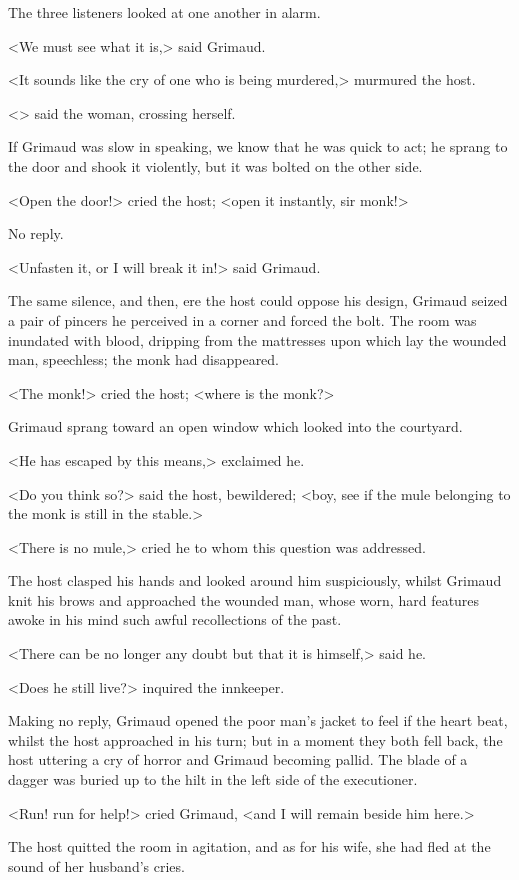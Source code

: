 The three listeners looked at one another in alarm.

<We must see what it is,> said Grimaud.

<It sounds like the cry of one who is being murdered,> murmured the host.

<> said the woman, crossing herself.

If Grimaud was slow in speaking, we know that he was quick to act; he sprang to the door and shook it violently, but it was bolted on the other side.

<Open the door!> cried the host; <open it instantly, sir monk!>

No reply.

<Unfasten it, or I will break it in!> said Grimaud.

The same silence, and then, ere the host could oppose his design, Grimaud seized a pair of pincers he perceived in a corner and forced the bolt. The room was inundated with blood, dripping from the mattresses upon which lay the wounded man, speechless; the monk had disappeared.

<The monk!> cried the host; <where is the monk?>

Grimaud sprang toward an open window which looked into the courtyard.

<He has escaped by this means,> exclaimed he.

<Do you think so?> said the host, bewildered; <boy, see if the mule belonging to the monk is still in the stable.>

<There is no mule,> cried he to whom this question was addressed.

The host clasped his hands and looked around him suspiciously, whilst Grimaud knit his brows and approached the wounded man, whose worn, hard features awoke in his mind such awful recollections of the past.

<There can be no longer any doubt but that it is himself,> said he.

<Does he still live?> inquired the innkeeper.

Making no reply, Grimaud opened the poor man's jacket to feel if the heart beat, whilst the host approached in his turn; but in a moment they both fell back, the host uttering a cry of horror and Grimaud becoming pallid. The blade of a dagger was buried up to the hilt in the left side of the executioner.

<Run! run for help!> cried Grimaud, <and I will remain beside him here.>

The host quitted the room in agitation, and as for his wife, she had fled at the sound of her husband's cries. 